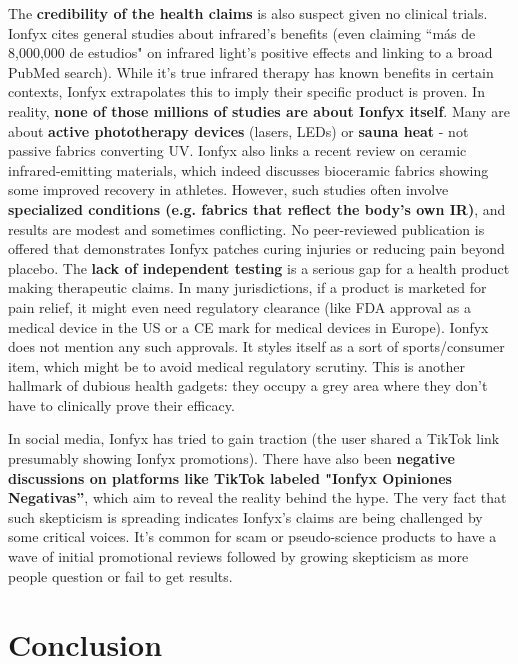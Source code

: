 \documentclass{article}
\begin{document}
The \textbf{credibility of the health claims} is also suspect given no clinical trials. Ionfyx cites general studies about infrared's benefits (even claiming “más de 8,000,000 de estudios" on infrared light's positive effects and linking to a broad PubMed search). While it's true infrared therapy has known benefits in certain contexts, Ionfyx extrapolates this to imply their specific product is proven. In reality, \textbf{none of those millions of studies are about Ionfyx itself}. Many are about \textbf{active phototherapy devices} (lasers, LEDs) or \textbf{sauna heat} - not passive fabrics converting UV. Ionfyx also links a recent review on ceramic infrared-emitting materials, which indeed discusses bioceramic fabrics showing some improved recovery in athletes. However, such studies often involve \textbf{specialized conditions (e.g. fabrics that reflect the body's own IR)}, and results are modest and sometimes conflicting. No peer-reviewed publication is offered that demonstrates Ionfyx patches curing injuries or reducing pain beyond placebo. The \textbf{lack of independent testing} is a serious gap for a health product making therapeutic claims. In many jurisdictions, if a product is marketed for pain relief, it might even need regulatory clearance (like FDA approval as a medical device in the US or a CE mark for medical devices in Europe). Ionfyx does not mention any such approvals. It styles itself as a sort of sports/consumer item, which might be to avoid medical regulatory scrutiny. This is another hallmark of dubious health gadgets: they occupy a grey area where they don't have to clinically prove their efficacy.

In social media, Ionfyx has tried to gain traction (the user shared a TikTok link presumably showing Ionfyx promotions). There have also been \textbf{negative discussions on platforms like TikTok labeled "Ionfyx Opiniones Negativas”}, which aim to reveal the reality behind the hype. The very fact that such skepticism is spreading indicates Ionfyx's claims are being challenged by some critical voices. It's common for scam or pseudo-science products to have a wave of initial promotional reviews followed by growing skepticism as more people question or fail to get results.

\section{Conclusion}
\end{document}
